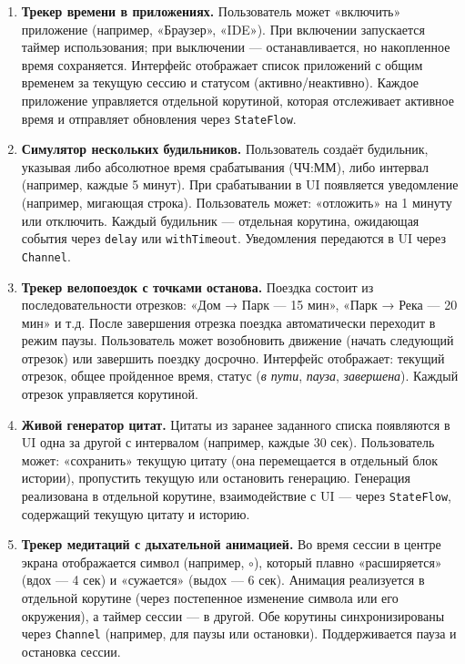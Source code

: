 \begin{enumerate}
\item[15]
\textbf{Трекер времени в приложениях.} Пользователь может «включить» приложение (например, «Браузер», «IDE»). При включении запускается таймер использования; при выключении — останавливается, но накопленное время сохраняется. Интерфейс отображает список приложений с общим временем за текущую сессию и статусом (активно/неактивно). Каждое приложение управляется отдельной корутиной, которая отслеживает активное время и отправляет обновления через \texttt{StateFlow}.

\item[16]
\textbf{Симулятор нескольких будильников.} Пользователь создаёт будильник, указывая либо абсолютное время срабатывания (ЧЧ:ММ), либо интервал (например, каждые 5 минут). При срабатывании в UI появляется уведомление (например, мигающая строка). Пользователь может: «отложить» на 1 минуту или отключить. Каждый будильник — отдельная корутина, ожидающая события через \texttt{delay} или \texttt{withTimeout}. Уведомления передаются в UI через \texttt{Channel}.

\item[17]
\textbf{Трекер велопоездок с точками останова.} Поездка состоит из последовательности отрезков: «Дом → Парк — 15 мин», «Парк → Река — 20 мин» и т.д. После завершения отрезка поездка автоматически переходит в режим паузы. Пользователь может возобновить движение (начать следующий отрезок) или завершить поездку досрочно. Интерфейс отображает: текущий отрезок, общее пройденное время, статус (\textit{в пути}, \textit{пауза}, \textit{завершена}). Каждый отрезок управляется корутиной.

\item[18]
\textbf{Живой генератор цитат.} Цитаты из заранее заданного списка появляются в UI одна за другой с интервалом (например, каждые 30 сек). Пользователь может: «сохранить» текущую цитату (она перемещается в отдельный блок истории), пропустить текущую или остановить генерацию. Генерация реализована в отдельной корутине, взаимодействие с UI — через \texttt{StateFlow}, содержащий текущую цитату и историю.

\item[19]
\textbf{Трекер медитаций с дыхательной анимацией.} 
Во время сессии в центре экрана отображается символ (например, \texttt{$\circ$}), который плавно «расширяется» (вдох — 4 сек) и «сужается» (выдох — 6 сек). Анимация реализуется в отдельной корутине (через постепенное изменение символа или его окружения), а таймер сессии — в другой. Обе корутины синхронизированы через \texttt{Channel} (например, для паузы или остановки). Поддерживается пауза и остановка сессии.


\end{enumerate}
